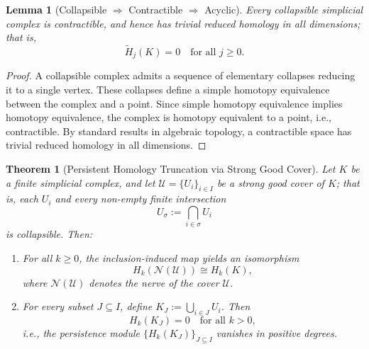 \documentclass[12pt,a4paper,twoside, reqno, tbtags]{article}
\numberwithin{equation}{section}
\newtheorem{theorem}{Theorem}[section]
\newtheorem{lemma}{Lemma}[section]
\begin{document}
\begin{lemma}[Collapsible \(\Rightarrow\) Contractible \(\Rightarrow\) Acyclic]
\label{lem:collapsible-acyclic}
Every collapsible simplicial complex is contractible, and hence has trivial reduced homology in all dimensions; that is,
\[
\widetilde{H}_j(K) = 0 \quad \text{for all } j \geq 0.
\]
\end{lemma}

\begin{proof}
A collapsible complex admits a sequence of elementary collapses reducing it to a single vertex. These collapses define a simple homotopy equivalence between the complex and a point. Since simple homotopy equivalence implies homotopy equivalence, the complex is homotopy equivalent to a point, i.e., contractible. By standard results in algebraic topology, a contractible space has trivial reduced homology in all dimensions.
\end{proof}

\begin{theorem}[Persistent Homology Truncation via Strong Good Cover]\label{persistent-truncation}
Let \( K \) be a finite simplicial complex, and let \( \mathcal{U} = \{U_i\}_{i \in I} \) be a \emph{strong good cover} of \( K \); that is, each \( U_i \) and every non-empty finite intersection
\[
U_\sigma := \bigcap_{i \in \sigma} U_i
\]
is \emph{collapsible}. Then:

\begin{enumerate}
    \item For all \( k \geq 0 \), the inclusion-induced map yields an isomorphism
    \[
    H_k(\mathcal{N}(\mathcal{U})) \cong H_k(K),
    \]
    where \( \mathcal{N}(\mathcal{U}) \) denotes the nerve of the cover \( \mathcal{U} \).

    \item For every subset \( J \subseteq I \), define \( K_J := \bigcup_{i \in J} U_i \). Then
    \[
    H_k(K_J) = 0 \quad \text{for all } k > 0,
    \]
    i.e., the persistence module \( \{ H_k(K_J) \}_{J \subseteq I} \) vanishes in positive degrees.
\end{enumerate}
\end{theorem}
\end{document}
